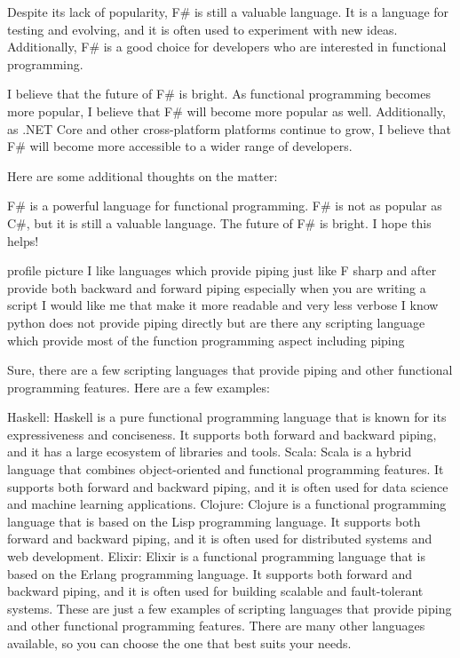 \documentclass[11pt]{article}
\begin{document}
Despite its lack of popularity, F\# is still a valuable language. It is a language for testing and evolving, and it is often used to experiment with new ideas. Additionally, F\# is a good choice for developers who are interested in functional programming.

I believe that the future of F\# is bright. As functional programming becomes more popular, I believe that F\# will become more popular as well. Additionally, as .NET Core and other cross-platform platforms continue to grow, I believe that F\# will become more accessible to a wider range of developers.

Here are some additional thoughts on the matter:

F\# is a powerful language for functional programming.
F\# is not as popular as C\#, but it is still a valuable language.
The future of F\# is bright.
I hope this helps!

profile picture
I like languages which provide piping
just like F sharp
and after provide both backward and forward piping
especially when you are writing a script
I would like me that make it more readable and
very less verbose
I know python does not provide
piping
directly
but are there any scripting language
which provide
most of the function programming aspect including piping

Sure, there are a few scripting languages that provide piping and other functional programming features. Here are a few examples:

Haskell: Haskell is a pure functional programming language that is known for its expressiveness and conciseness. It supports both forward and backward piping, and it has a large ecosystem of libraries and tools.
Scala: Scala is a hybrid language that combines object-oriented and functional programming features. It supports both forward and backward piping, and it is often used for data science and machine learning applications.
Clojure: Clojure is a functional programming language that is based on the Lisp programming language. It supports both forward and backward piping, and it is often used for distributed systems and web development.
Elixir: Elixir is a functional programming language that is based on the Erlang programming language. It supports both forward and backward piping, and it is often used for building scalable and fault-tolerant systems.
These are just a few examples of scripting languages that provide piping and other functional programming features. There are many other languages available, so you can choose the one that best suits your needs.
\end{document}
